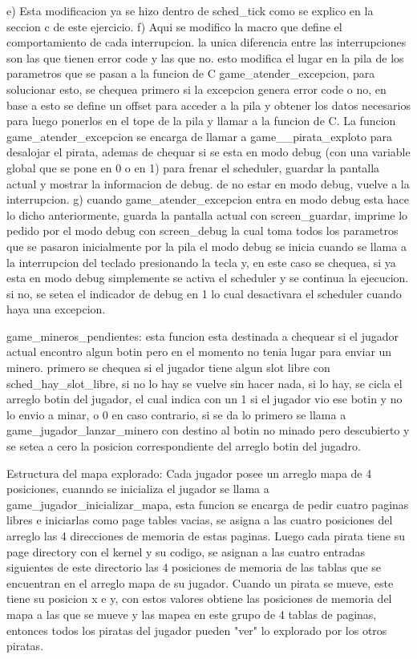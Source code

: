 e) Esta modificacion ya se hizo dentro de sched_tick como se explico en la seccion c de este ejercicio.
f) Aqui se modifico la macro que define el comportamiento de cada interrupcion. la unica diferencia entre las interrupciones
  son las que tienen error code y las que no. esto modifica el lugar en la pila de los parametros que se pasan a la funcion de C
  game_atender_excepcion, para solucionar esto, se chequea primero si la excepcion genera error code o no, en base a esto se define un
  offset para acceder a la pila y obtener los datos necesarios para luego ponerlos en el tope de la pila y llamar a la funcion de C.
  La funcion game_atender_excepcion se encarga de llamar a game__pirata_exploto para desalojar el pirata, ademas de chequar
  si se esta en modo debug (con una variable global que se pone en 0 o en 1) para frenar el scheduler, guardar la pantalla actual y mostrar la informacion de debug. de no estar
  en modo debug, vuelve a la interrupcion.
g) cuando game_atender_excepcion entra en modo debug esta hace lo dicho anteriormente, guarda la pantalla actual con screen_guardar,
  imprime lo pedido por el modo debug con screen_debug la cual toma todos los parametros que se pasaron inicialmente por la pila
  el modo debug se inicia cuando se llama a la interrupcion del teclado presionando la tecla y, en este caso se chequea, si ya esta en modo
  debug simplemente se activa el scheduler y se continua la ejecucion. si no, se setea el indicador de debug en 1 lo cual desactivara
  el scheduler cuando haya una excepcion.




game_mineros_pendientes:
  esta funcion esta destinada a chequear si el jugador actual encontro algun botin pero en el momento no tenia lugar para enviar
  un minero.
  primero se chequea si el jugador tiene algun slot libre con sched_hay_slot_libre, si no lo hay se vuelve sin hacer nada,
  si lo hay, se cicla el arreglo botin del jugador, el cual indica con un 1 si el jugador vio ese botin y no lo envio a minar, o
  0 en caso contrario, si se da lo primero se llama a game_jugador_lanzar_minero con destino al botin no minado pero descubierto
  y se setea a cero la posicion correspondiente del arreglo botin del jugadro.

Estructura del mapa explorado:
  Cada jugador posee un arreglo mapa de 4 posiciones, cuanndo se inicializa el jugador se llama a game_jugador_inicializar_mapa,
  esta funcion se encarga de pedir cuatro paginas libres e iniciarlas como page tables vacias, se asigna a las cuatro posiciones
  del arreglo las 4 direcciones de memoria de estas paginas.
  Luego cada pirata tiene su page directory con el kernel y su codigo, se asignan a las cuatro entradas siguientes de este directorio
  las 4 posiciones de memoria de las tablas que se encuentran en el arreglo mapa de su jugador.
  Cuando un pirata se mueve, este tiene su posicion x e y, con estos valores obtiene las posiciones de memoria del mapa a las que se mueve
  y las mapea en este grupo de 4 tablas de paginas, entonces todos los piratas del jugador pueden "ver" lo explorado por los
  otros piratas.

